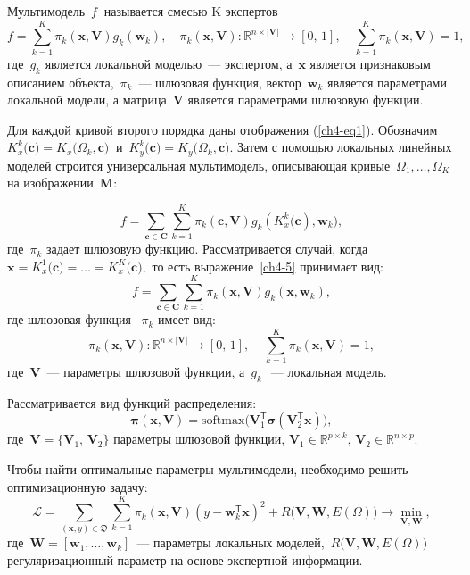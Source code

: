 \begin{definition}
Мультимодель~$ f~$ называется смесью K экспертов
\[
	f = \sum\limits_{k = 1}^{K}\pi_k(\mathbf{x}, \mathbf{V})g_k(\mathbf{w}_k),  \quad \pi_k(\mathbf{x}, \mathbf{V}): \mathbb{R}^{n\times |\mathbf{V}|} \rightarrow [0, \, 1], \quad \sum\limits_{k = 1}^{K}\pi_k(\mathbf{x}, \mathbf{V}) = 1, 
\]
где~$g_k$ является локальной моделью~--- экспертом, а~$\mathbf{x}$ является признаковым описанием объекта,~$\pi_k$~--- шлюзовая функция, вектор~$\mathbf{w}_k$ является параметрами локальной модели, а матрица~$\mathbf{V}$ является параметрами шлюзовую функции.
\end{definition}

Для каждой кривой второго порядка даны отображения (\ref{ch4-eq1}). Обозначим~$ K_x^k \bigr(\mathbf{c} \bigr) = K_x \bigr (\Omega_k, \mathbf{c} \bigr)~$ и~$K_y^k \bigr (\mathbf{c}\bigr) = K_y\bigr(\Omega_k, \mathbf{c}\bigr)$.
Затем с помощью локальных линейных моделей строится универсальная мультимодель, описывающая кривые~$\Omega_1, \dots, \Omega_K$ на изображении~$\mathbf{M}$:

\[
\label{ch4-5}
	f = \sum\limits_{\mathbf{c} \in \mathbf{C}} \sum_{k = 1}^{K} \pi_k(\mathbf{c}, \mathbf{V})g_k(K^k_{x}\bigl(\mathbf{c}), \mathbf{w}_k), 
\]
где~$\pi_k$ задает шлюзовую функцию. Рассматривается случай, когда~$\mathbf{x}=K^1_{x}\bigl(\mathbf{c})=\ldots=K^K_{x}\bigl(\mathbf{c}),$ то есть выражение~\eqref{ch4-5} принимает вид:
\[
	f = \sum\limits_{\mathbf{c} \in \mathbf{C}} \sum_{k = 1}^{K} \pi_k(\mathbf{x}, \mathbf{V})g_k(\mathbf{x}, \mathbf{w}_k), 
\]
где шлюзовая функция ~$\pi_k$ имеет вид:
\[
	\pi_k(\mathbf{x}, \mathbf{V}): \mathbb{R}^{n\times |\mathbf{V}|} \rightarrow [0, \, 1], \; \; \; \; \sum\limits_{k = 1}^{K}\pi_k(\mathbf{x}, \mathbf{V}) = 1,
\]
где~$\mathbf{V}$~--- параметры шлюзовой функции, а~$ g_k~$~--- локальная модель.
    
Рассматривается вид функций распределения:
\[
    \boldsymbol{\pi}(\mathbf{x}, \mathbf{V}) = \text{softmax}\bigl(\mathbf{V}_1^{\mathsf{T}}\boldsymbol{\sigma}(\mathbf{V}_2^{\mathsf{T}}\mathbf{x}) \bigr),
\]
где~$\mathbf{V} = \{ \mathbf{V}_1, \, \mathbf{V}_2\}$ параметры шлюзовой функции,
$\mathbf{V}_1 \in \mathbb{R}^{p \times k}, \, \mathbf{V}_2 \in \mathbb{R}^{n \times p}$. 

Чтобы найти оптимальные параметры мультимодели, необходимо решить оптимизационную задачу:
\[\label{9}
\mathcal{L} = \sum\limits_{(\mathbf{x}, y) \in \mathfrak{D}} \sum\limits_{k = 1}^{K} \pi_k(\mathbf{x}, \mathbf{V})(y - \mathbf{w}_k^{\mathsf{T}}\mathbf{x})^2 + R\bigl(\mathbf{V}, \mathbf{W}, E(\Omega)\bigr) \rightarrow \min_{\mathbf{V}, \mathbf{W}},
\]
где~$\mathbf{W} = [\mathbf{w}_1, \dots, \mathbf{w}_k]$~--- параметры локальных моделей,~$R\bigl(\mathbf{V}, \mathbf{W}, E(\Omega)\bigr)$ регуляризационный параметр на основе экспертной информации.

